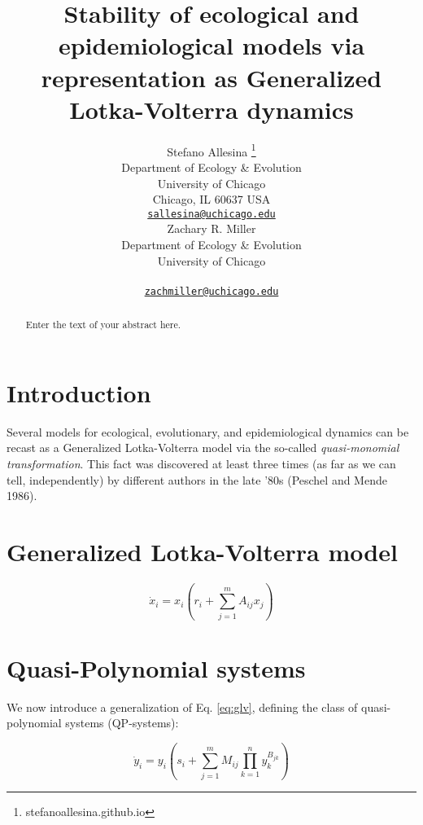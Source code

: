 \documentclass{article}
\title{Stability of ecological and epidemiological models via
representation as Generalized Lotka-Volterra dynamics}
\author{
    Stefano Allesina
    \thanks{stefanoallesina.github.io}
   \\
    Department of Ecology \& Evolution \\
    University of Chicago \\
  Chicago, IL 60637 USA \\
  \texttt{\href{mailto:sallesina@uchicago.edu}{\nolinkurl{sallesina@uchicago.edu}}} \\
   \And
    Zachary R. Miller
   \\
    Department of Ecology \& Evolution \\
    University of Chicago \\
   \\
  \texttt{\href{mailto:zachmiller@uchicago.edu}{\nolinkurl{zachmiller@uchicago.edu}}} \\
  }
\begin{document}
\maketitle

\def\tightlist{}


\begin{abstract}
Enter the text of your abstract here.
\end{abstract}


\hypertarget{introduction}{%
\section{Introduction}\label{introduction}}

Several models for ecological, evolutionary, and epidemiological
dynamics can be recast as a Generalized Lotka-Volterra model via the
so-called \emph{quasi-monomial transformation}. This fact was discovered
at least three times (as far as we can tell, independently) by different
authors in the late '80s (Peschel and Mende 1986).

\hypertarget{generalized-lotka-volterra-model}{%
\section{Generalized Lotka-Volterra
model}\label{generalized-lotka-volterra-model}}

\label{sec:glv}

\begin{equation}
\label{eq:glv}
\dot{x}_i = x_i \left(r_i + \sum_{j=1}^m A_{ij} x_j \right)
\end{equation}

\hypertarget{quasi-polynomial-systems}{%
\section{Quasi-Polynomial systems}\label{quasi-polynomial-systems}}

\label{sec:qp}

We now introduce a generalization of Eq. \ref{eq:glv}, defining the
class of quasi-polynomial systems (QP-systems):

\begin{equation}
\label{eq:qp}
\dot{y}_i = y_i \left( s_i + \sum_{j = 1}^m M_{ij} \prod_{k = 1}^n y_k^{B_{jk}} \right)
\end{equation}
\end{document}
